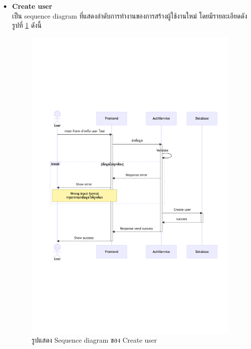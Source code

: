 \documentclass[12pt,oneside,openright,a4paper]{cpe-thai-project}
\begin{document}
\begin{itemize}
    \newpage
    \item \textbf{Create user} \\
    เป็น sequence diagram ที่แสดงลำดับการทำงานของการสร้างผู้ใช้งานใหม่ โดยมีรายละเอียดดังรูปที่ \ref{fig:sqCreateUser} ดังนี้
    \begin{figure}[!ht]\centering
        \includegraphics[width=15cm, trim={1cm 9cm 0.5cm 9cm},clip]{./assets/sequence-diagram/create-user.png}
        \caption{รูปแสดง Sequence diagram ของ Create user}\label{fig:sqCreateUser}
    \end{figure}


\end{itemize}
\end{document}
